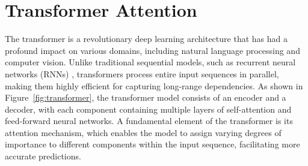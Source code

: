 
\section{Transformer Attention}
\label{transformer}
The transformer \cite{vaswani2017attention} is a revolutionary deep learning architecture that has had a profound impact on various domains, including natural language processing and computer vision. Unlike traditional sequential models, such as recurrent neural networks (RNNs) \cite{rumelhart1985learning}, transformers process entire input sequences in parallel, making them highly efficient for capturing long-range dependencies. As shown in Figure~\ref{fig:transformer}, the transformer model consists of an encoder and a decoder, with each component containing multiple layers of self-attention and feed-forward neural networks. A fundamental element of the transformer is its attention mechanism, which enables the model to assign varying degrees of importance to different components within the input sequence, facilitating more accurate predictions.

